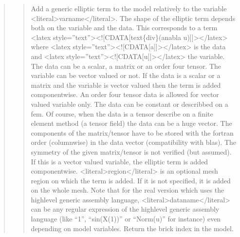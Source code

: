 \documentclass[a4paper,11pt,english]{sphinxmanual}
\begin{document}
\begin{quote}
\begin{quote}
\sphinxAtStartPar
Add a generic elliptic term to the model relatively to the variable \textless{}literal\textgreater{}varname\textless{}/literal\textgreater{}.
The shape of the elliptic term depends both on the variable and the data.
This corresponds to a term
\textless{}latex style=”text”\textgreater{}\textless{}!{[}CDATA{[}\sphinxhyphen{}text\{div\}(anabla u){]}{]}\textgreater{}\textless{}/latex\textgreater{}
where \textless{}latex style=”text”\textgreater{}\textless{}!{[}CDATA{[}a{]}{]}\textgreater{}\textless{}/latex\textgreater{} is the data and \textless{}latex style=”text”\textgreater{}\textless{}!{[}CDATA{[}u{]}{]}\textgreater{}\textless{}/latex\textgreater{} the variable. The data can be
a scalar,
a matrix or an order four tensor. The variable can be vector valued or
not. If the data is a scalar or a matrix and the variable is vector
valued then the term is added componentwise. An order four tensor data
is allowed for vector valued variable only. The data can be constant or
describbed on a fem. Of course, when the data is a tensor describe on a
finite element method (a tensor field) the data can be a huge vector.
The components of the matrix/tensor have to be stored with the fortran
order (columnwise) in the data vector (compatibility with blas). The
symmetry of the given matrix/tensor is not verified (but assumed). If
this is a vector valued variable, the elliptic term is added
componentwise. \textless{}literal\textgreater{}region\textless{}/literal\textgreater{} is an optional mesh region on which the term is
added. If it is not specified, it is added on the whole mesh. Note that
for the real
version which uses the high\sphinxhyphen{}level generic assembly language, \textless{}literal\textgreater{}dataname\textless{}/literal\textgreater{}
can be any regular expression of the high\sphinxhyphen{}level generic assembly
language (like “1”, “sin(X(1))” or “Norm(u)” for instance) even
depending on model variables. Return the
brick index in the model.
\end{quote}

\sphinxAtStartPar
{}
\begin{quote}


\end{quote}
\end{quote}
\end{document}

